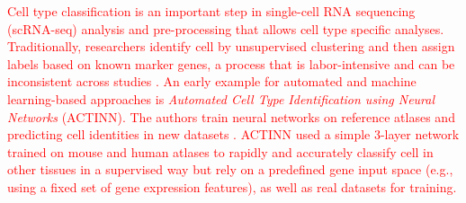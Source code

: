 \documentclass{article}
\newcommand{\gpt}[1]{\textcolor{red}{#1}}
\begin{document}
\gpt{Cell type classification is an important step in single-cell RNA sequencing (scRNA-seq) analysis and pre-processing that allows cell type specific analyses. Traditionally, researchers identify cell   by unsupervised clustering and then assign labels based on known marker genes, a process that is labor-intensive and can be inconsistent across studies \cite{ma2020actinn}. An early example for automated and machine learning-based approaches is \textit{Automated Cell Type Identification using Neural Networks} (ACTINN). The authors train neural networks on reference atlases and predicting cell identities in new datasets \cite{ma2020actinn}. ACTINN used a simple 3-layer network trained on mouse and human atlases to rapidly and accurately classify cell   in other tissues in a supervised way but rely on a predefined gene input space (e.g., using a fixed set of gene expression features), as well as real datasets for training.}
\end{document}
